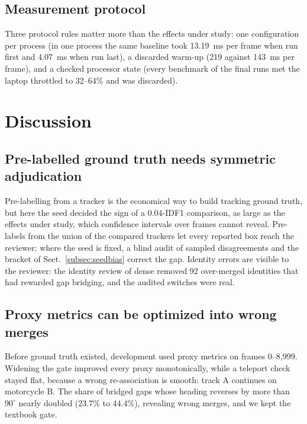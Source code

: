 \documentclass[twocolumn]{svjour3}
\begin{document}
\subsection{Measurement protocol}\label{subsec:protocol-lessons}

Three protocol rules matter more than the effects under study: one
configuration per process (in one process the same baseline took 13.19~ms per
frame when run first and 4.07~ms when run last), a discarded warm-up (219
against 143~ms per frame), and a checked processor state (every benchmark of
the final runs met the laptop throttled to 32--64\% and was discarded).

\section{Discussion}\label{sec:discussion}

\subsection{Pre-labelled ground truth needs symmetric adjudication}\label{subsec:annotation}

Pre-labelling from a tracker is the economical way to build tracking ground
truth, but here the seed decided the sign of a 0.04-IDF1 comparison, as large as
the effects under study, which confidence intervals over frames cannot reveal.
Pre-labels from the union of the compared trackers let every reported box reach
the reviewer; where the seed is fixed, a blind audit of sampled disagreements
and the bracket of Sect.~\ref{subsec:seedbias} correct the gap. Identity errors
are visible to the reviewer: the identity review of dense removed 92
over-merged identities that had rewarded gap bridging, and the audited switches
were real.

\subsection{Proxy metrics can be optimized into wrong merges}\label{subsec:proxy}

Before ground truth existed, development used proxy metrics on frames
0--8,999. Widening the gate improved every proxy monotonically, while a
teleport check stayed flat, because a wrong re-association is smooth: track A
continues on motorcycle B. The share of bridged gaps whose heading reverses by
more than $90^\circ$ nearly doubled (23.7\% to 44.4\%), revealing wrong merges, and
we kept the textbook gate.
\end{document}
